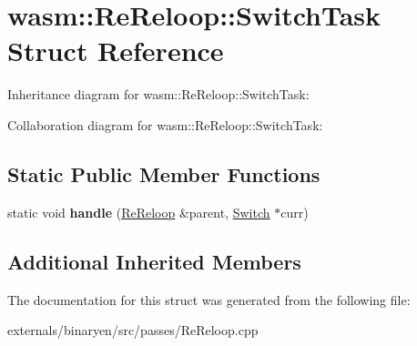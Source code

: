 \hypertarget{structwasm_1_1_re_reloop_1_1_switch_task}{}\section{wasm\+:\+:Re\+Reloop\+:\+:Switch\+Task Struct Reference}
\label{structwasm_1_1_re_reloop_1_1_switch_task}


Inheritance diagram for wasm\+:\+:Re\+Reloop\+:\+:Switch\+Task\+:


Collaboration diagram for wasm\+:\+:Re\+Reloop\+:\+:Switch\+Task\+:
\subsection*{Static Public Member Functions}
\begin{DoxyCompactItemize}
\item 
\mbox{\label{structwasm_1_1_re_reloop_1_1_switch_task_ae6f1f13c41223662f0f760632570717b}} 
static void {\bfseries handle} (\mbox{\hyperlink{structwasm_1_1_re_reloop}{Re\+Reloop}} \&parent, \mbox{\hyperlink{classwasm_1_1_switch}{Switch}} $\ast$curr)
\end{DoxyCompactItemize}
\subsection*{Additional Inherited Members}


The documentation for this struct was generated from the following file\+:\begin{DoxyCompactItemize}
\item 
externals/binaryen/src/passes/Re\+Reloop.\+cpp\end{DoxyCompactItemize}
